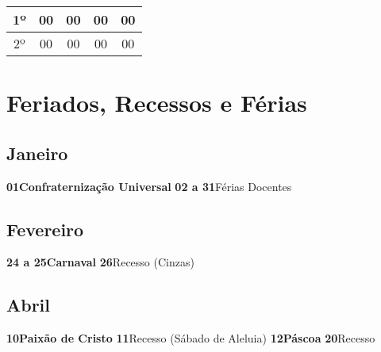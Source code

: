 \documentclass[thesis]{hmcposter}
\begin{document}
\begin{poster}
\begin{center}
\begin{table}
{\begin{tabular}{|c|c|c|c|c|}
1º & 00 & 00 & 00 & 00 \\ \hline
2º & 00 & 00 & 00 & 00 \\ \hline
\end{tabular}
}
\end{table}
\newline
\null
\newline
\end{center}
\vfill
\null
\newpage\onespacing \section{\color{hmcorange}Feriados, Recessos e Férias}\subsection{Janeiro}\textbf{01}\quad \quad \quad \quad \textbf{Confraternização Universal} \newline\textbf{02 a 31}\quad \quad Férias Docentes \newline\subsection{Fevereiro}\textbf{24 a 25}\quad \quad \textbf{Carnaval} \newline\textbf{26}\quad \quad \quad \quad Recesso (Cinzas) \newline\subsection{Abril}\textbf{10}\quad \quad \quad \quad \textbf{Paixão de Cristo} \newline\textbf{11}\quad \quad \quad \quad Recesso (Sábado de Aleluia) \newline\textbf{12}\quad \quad \quad \quad \textbf{Páscoa} \newline\textbf{20}\quad \quad \quad \quad Recesso \newline
\end{poster}
\end{document}
